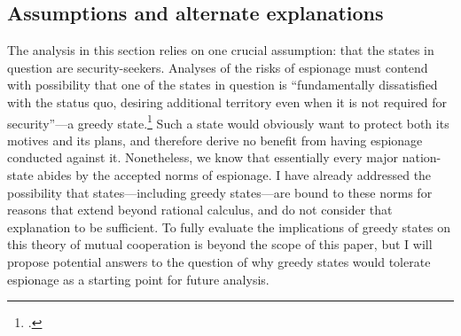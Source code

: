 \documentclass[14pt]{extarticle}
\begin{document}

\subsection{Assumptions and alternate explanations}
The analysis in this section relies on one crucial assumption: that the states in question are security-seekers. Analyses of the risks of espionage must contend with possibility that one of the states in question is \enquote{fundamentally dissatisfied with the status quo, desiring additional territory even when it is not required for security}---a greedy state.\footcite[p.~4]{glaser_rational_2010} Such a state would obviously want to protect both its motives and its plans, and therefore derive no benefit from having espionage conducted against it. Nonetheless, we know that essentially every major nation-state abides by the accepted norms of espionage. I have already addressed the possibility that states---including greedy states---are bound to these norms for reasons that extend beyond rational calculus, and do not consider that explanation to be sufficient. To fully evaluate the implications of greedy states on this theory of mutual cooperation is beyond the scope of this paper, but I will propose potential answers to the question of why greedy states would tolerate espionage as a starting point for future analysis.
\end{document}

